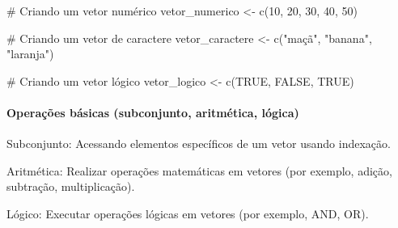 \documentclass[
  letterpaper,
  DIV=11,
  numbers=noendperiod]{scrartcl}
\let\oldparagraph\paragraph
\renewcommand{\paragraph}[1]{\oldparagraph{#1}\mbox{}}
\newenvironment{Shaded}{\begin{snugshade}}{\end{snugshade}}
\newcommand{\CommentTok}[1]{\textcolor[rgb]{0.37,0.37,0.37}{#1}}
\newcommand{\ConstantTok}[1]{\textcolor[rgb]{0.56,0.35,0.01}{#1}}
\newcommand{\DecValTok}[1]{\textcolor[rgb]{0.68,0.00,0.00}{#1}}
\newcommand{\FunctionTok}[1]{\textcolor[rgb]{0.28,0.35,0.67}{#1}}
\newcommand{\NormalTok}[1]{\textcolor[rgb]{0.00,0.23,0.31}{#1}}
\newcommand{\OtherTok}[1]{\textcolor[rgb]{0.00,0.23,0.31}{#1}}
\newcommand{\StringTok}[1]{\textcolor[rgb]{0.13,0.47,0.30}{#1}}
\begin{document}
\begin{Shaded}
\begin{Highlighting}[]
\CommentTok{\# Criando um vetor numérico}
\NormalTok{vetor\_numerico }\OtherTok{\textless{}{-}} \FunctionTok{c}\NormalTok{(}\DecValTok{10}\NormalTok{, }\DecValTok{20}\NormalTok{, }\DecValTok{30}\NormalTok{, }\DecValTok{40}\NormalTok{, }\DecValTok{50}\NormalTok{)}

\CommentTok{\# Criando um vetor de caractere}
\NormalTok{vetor\_caractere }\OtherTok{\textless{}{-}} \FunctionTok{c}\NormalTok{(}\StringTok{"maçã"}\NormalTok{, }\StringTok{"banana"}\NormalTok{, }\StringTok{"laranja"}\NormalTok{)}

\CommentTok{\# Criando um vetor lógico}
\NormalTok{vetor\_logico }\OtherTok{\textless{}{-}} \FunctionTok{c}\NormalTok{(}\ConstantTok{TRUE}\NormalTok{, }\ConstantTok{FALSE}\NormalTok{, }\ConstantTok{TRUE}\NormalTok{)}
\end{Highlighting}
\end{Shaded}

\hypertarget{operauxe7uxf5es-buxe1sicas-subconjunto-aritmuxe9tica-luxf3gica}{%
\paragraph{Operações básicas (subconjunto, aritmética,
lógica)}\label{operauxe7uxf5es-buxe1sicas-subconjunto-aritmuxe9tica-luxf3gica}}

Subconjunto: Acessando elementos específicos de um vetor usando
indexação.

Aritmética: Realizar operações matemáticas em vetores (por exemplo,
adição, subtração, multiplicação).

Lógico: Executar operações lógicas em vetores (por exemplo, AND, OR).
\end{document}
